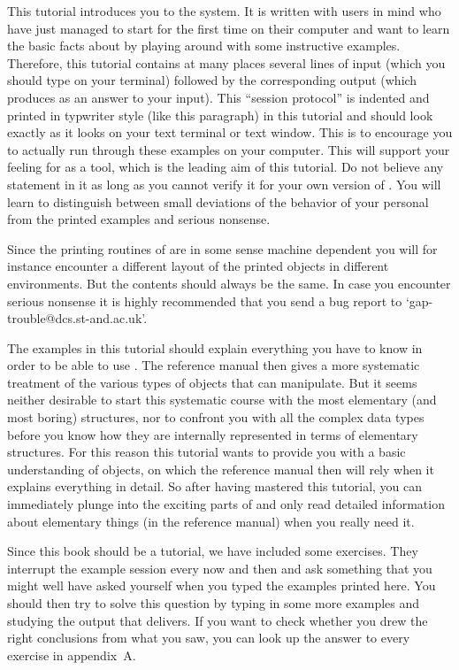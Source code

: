 
This tutorial introduces you to  the {\GAP}  system.  It is written  with
users in mind who have just managed to start {\GAP} for the first time on
their computer and want to learn the basic facts  about {\GAP} by playing
around with some instructive  examples. Therefore, this tutorial contains
at many  places several lines of  input  (which you  should type  on your
terminal) followed by the corresponding output  (which {\GAP} produces as
an answer to your input).
\begintt
    This ``session protocol'' is indented and printed in typwriter style
    (like this paragraph) in this tutorial and should look exactly as it
    looks on your text terminal or text window.
\endtt
This is  to encourage you to actually  run through these examples on your
computer. This will support your  feeling for {\GAP}  as a tool, which is
the leading aim of this  tutorial. Do not believe any  statement in it as
long  as you cannot verify  it for your own  version of  {\GAP}. You will
learn to distinguish  between small  deviations of  the behavior of  your
personal {\GAP} from the printed examples and serious nonsense.

Since the printing routines of {\GAP} are in some sense machine dependent
you will for instance encounter a different layout of the printed objects
in different environments.  But the  contents should always be the  same.
In case you encounter serious nonsense  it is highly recommended that you
send a bug report to `gap-trouble@dcs.st-and.ac.uk'.

The examples in this tutorial should  explain everything you have to know
in order to be able to use {\GAP}. The reference manual then gives a more
systematic  treatment of  the various types  of objects  that  {\GAP} can
manipulate.  But it  seems neither  desirable   to start this  systematic
course with  the  most elementary (and most   boring) structures, nor  to
confront you with all the complex data types before you know how they are
internally represented in terms of elementary structures. For this reason
this tutorial wants to  provide you with a  basic understanding of {\GAP}
objects, on  which the reference manual  then will rely when  it explains
everything in detail.  So  after having mastered  this tutorial, you  can
immediately  plunge   into the exciting  parts  of  {\GAP} and  only read
detailed information about elementary   things (in the reference  manual)
when you really need it.

Since this    book should  be    a  tutorial,  we  have    included  some
exercises. They interrupt the example session every now  and then and ask
something that you might   well have asked yourself   when you typed  the
examples printed here.   You should then try to   solve this question  by
typing  in  some   more examples  and   studying the  output  that {\GAP}
delivers. If you  want to  check whether  you drew the  right conclusions
from  what  you saw, you  can  look up the   answer  to every exercise in
appendix~A\null.

